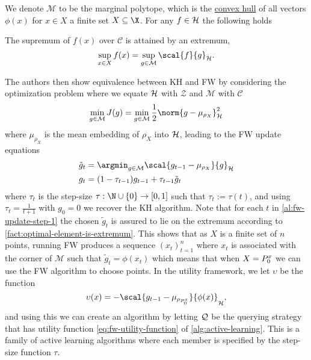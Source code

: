 We denote \(\mathcal{M}\) to be the marginal polytope, which is the
\hyperref[def:conv-hull]{convex hull} of all vectors \(\phi(x)\) for \(x \in X\)
a finite set \(X \subseteq \X\). For any \(f \in \mathcal{H}\) the following holds
\begin{fact}
  \label{fact:optimal-element-is-extremum}
  The supremum of \(f(x)\) over
  \(\mathcal{C}\) is attained by an extremum,
\begin{equation*}
  \label{eq:optimal-element-is-extremum}
  \sup_{x \in X} f(x) = \sup_{g \in
    \mathcal{M}} \scal{f}{g}_{\rkhs{H}}.
\end{equation*}
\end{fact}
The authors then show equivalence
between KH and FW by considering the optimization problem where we equate
\(\mathcal{H}\) with \(\mathcal{Z}\) and \(\mathcal{M}\) with \(\mathcal{C}\)
\begin{equation*}
\label{eq:fw-kh-optimisation-problem} \min_{g \in \mathcal{M}} J(g) =
\min_{g \in \mathcal{M}}\frac{1}{2}\norm{g - \mu_{\rho_{X}}}_{\rkhs{H}}^{2}
\end{equation*}
where \(\mu_{\rho_X}\) is the mean embedding of \(\rho_X\)
into \(\mathcal{H}\), leading to the FW update equations
\begin{align}
  \tilde{g}_{t} & = \argmin_{g \in \mathcal{M}} \scal{g_{t-1} -
                  \mu_{\rho_{X}}}{g}_{\rkhs{H}} \label{al:fw-update-step-1}\\
  g_{t} & = (1 - \tau_{t-1}) g_{t-1} + \tau_{t-1} \tilde{g}_{t} \label{al:fw-update-step-2}
\end{align}
where \(\tau_t\) is the step-size \(\tau: \N \cup \{0\} \to [0, 1]\) such that
\(\tau_t := \tau(t)\), and using \(\tau_{t} = \frac{1}{t+1}\) with \(g_0 = 0\)
we recover the KH algorithm. Note that for each \(t\) in \ref{al:fw-update-step-1} the chosen
\(\tilde{g}_{t}\) is assured to lie on the extremum according to
\ref{fact:optimal-element-is-extremum}. This shows that as \(X\) is a finite
set of \(n\) points, running FW produces a sequence \((x_{t})_{t=1}^{n}\) where
\(x_{t}\) is associated with the corner of \(\mathcal{M}\) such that
\(\tilde{g}_{t} = \phi(x_{t})\) which means that when \(X = P^x_{0}\) we
can use the FW algorithm to choose points. In the utility framework, we let
\(\upsilon\) be the function
\begin{equation}
\label{eq:fw-utility-function} \upsilon(x) = -\scal{g_{t-1} -
\mu_{\rho_{\poolsetx_{0}}}}{\phi(x)}_{\rkhs{H}},
\end{equation} and using this we can create an algorithm by letting
\(\mathcal{Q}\) be the querying strategy that has utility function
\ref{eq:fw-utility-function} of \ref{alg:active-learning}. This is a family of
active learning algorithms where each member is specified by the step-size function
\(\tau\).

